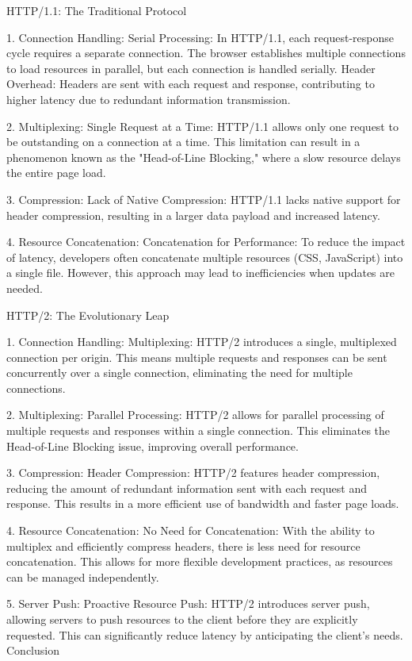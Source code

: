 HTTP/1.1: The Traditional Protocol

1. Connection Handling:
Serial Processing: In HTTP/1.1, each request-response cycle requires a separate connection. The browser establishes multiple connections to load resources in parallel, but each connection is handled serially.
Header Overhead: Headers are sent with each request and response, contributing to higher latency due to redundant information transmission.

2. Multiplexing:
Single Request at a Time: HTTP/1.1 allows only one request to be outstanding on a connection at a time. This limitation can result in a phenomenon known as the "Head-of-Line Blocking," where a slow resource delays the entire page load.

3. Compression:
Lack of Native Compression: HTTP/1.1 lacks native support for header compression, resulting in a larger data payload and increased latency.

4. Resource Concatenation:
Concatenation for Performance: To reduce the impact of latency, developers often concatenate multiple resources (CSS, JavaScript) into a single file. However, this approach may lead to inefficiencies when updates are needed.

HTTP/2: The Evolutionary Leap

1. Connection Handling:
Multiplexing: HTTP/2 introduces a single, multiplexed connection per origin. This means multiple requests and responses can be sent concurrently over a single connection, eliminating the need for multiple connections.

2. Multiplexing:
Parallel Processing: HTTP/2 allows for parallel processing of multiple requests and responses within a single connection. This eliminates the Head-of-Line Blocking issue, improving overall performance.

3. Compression:
Header Compression: HTTP/2 features header compression, reducing the amount of redundant information sent with each request and response. This results in a more efficient use of bandwidth and faster page loads.

4. Resource Concatenation:
No Need for Concatenation: With the ability to multiplex and efficiently compress headers, there is less need for resource concatenation. This allows for more flexible development practices, as resources can be managed independently.

5. Server Push:
Proactive Resource Push: HTTP/2 introduces server push, allowing servers to push resources to the client before they are explicitly requested. This can significantly reduce latency by anticipating the client's needs.
Conclusion


